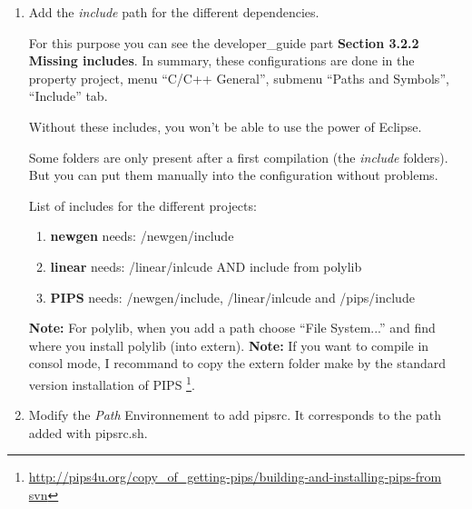 \documentclass[a4paper]{article}
\newcommand{\LINK}[1]{\url{#1}\xspace}
\begin{document}
\begin{enumerate}
\item Add the \emph{include} path for the different dependencies.
\label{enum:it:addsymb}

For this purpose you can see the developer\_guide part \textbf{Section 3.2.2 Missing includes}.
In summary, these configurations are done in the property project, menu ``C/C++ General'', submenu ``Paths and Symbols'', ``Include'' tab.

Without these includes, you won't be able to use the power of Eclipse.

Some folders are only present after a first compilation (the \textit{include} folders). 
But you can put them manually into the configuration without problems.

List of includes for the different projects:
\begin{enumerate}
\item \textbf{newgen} needs: /newgen/include
\item \textbf{linear} needs: /linear/inlcude AND include from {\color{red} polylib}
\item \textbf{PIPS} needs:   /newgen/include, /linear/inlcude and /pips/include
\end{enumerate}

\textbf{Note:} For polylib, when you add a path choose ``File System...'' and find where you install polylib (into extern).
\textbf{Note:} If you want to compile in consol mode, I recommand to copy the extern folder make by the standard version installation of PIPS \footnote{\LINK{http://pips4u.org/copy_of_getting-pips/building-and-installing-pips-from svn}}.

\item Modify the \emph{Path} Environnement to add pipsrc. 
It corresponds to the path added with pipsrc.sh.
\label{enum:it:addpath}


\end{enumerate}
\end{document}
